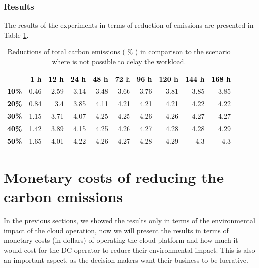 \subsubsection{Results}

The results of the experiments in terms of reduction of  emissions are presented in Table \ref{tab:flex_scheduling}.



\begin{table}[h]
\caption{Reductions of total carbon emissions ( \% ) in comparison to the scenario where is not possible to delay the workload.}\centering
\label{tab:flex_scheduling}
\begin{tabular}{|l|r|r|r|r|r|r|r|r|r|}
\hline
\backslashbox{$\alpha$}{$\beta$} &   \textcolor{black}{\textbf{ 1 h }} &  \textcolor{black}{\textbf{ 12 h }} &  \textcolor{black}{\textbf{ 24 h }} &  \textcolor{black}{\textbf{ 48 h }}  &   \textcolor{black}{\textbf{ 72 h}} &   \textcolor{black}{\textbf{ 96 h}} &   \textcolor{black}{\textbf{ 120 h }} &   \textcolor{black}{\textbf{ 144 h}} &   \textcolor{black}{\textbf{ 168 h}} \\ 
     \hline
 \textcolor{black}{ \textbf{10\%}}   &  0.46 &  2.59 &  3.14 &  3.48 &  3.66 &  3.76 &  3.81 &  3.85 &  3.85 \\ 
\hline
 \textcolor{black}{ \textbf{20\%}}   &  0.84 &  3.4 &  3.85 &  4.11 &  4.21 &  4.21 &  4.21 &  4.22 &  4.22 \\ 
\hline
 \textcolor{black}{ \textbf{30\%}}   &  1.15 &  3.71 &  4.07 &  4.25 &  4.25 &  4.26 &  4.26 &  4.27 &  4.27 \\ 
\hline
 \textcolor{black}{ \textbf{40\%}}   &  1.42 &  3.89 &  4.15 &  4.25 &  4.26 &  4.27 &  4.28 &  4.28 &  4.29 \\ 
\hline
 \textcolor{black}{ \textbf{50\%}}   &  1.65 &  4.01 &  4.22 &  4.26 &  4.27 &  4.28 &  4.29 &  4.3 &  4.3 \\ 
\hline
\end{tabular}
\end{table}


\section{ Monetary costs of reducing the carbon emissions}
\label{sec:costs}
In the previous sections, we showed the results only in terms of the environmental impact of the cloud operation, now we will present the results in terms of monetary costs (in dollars) of operating the cloud platform and how much it would cost for the DC operator to reduce their environmental impact. This is also an important aspect, as the decision-makers want their business to be lucrative.

